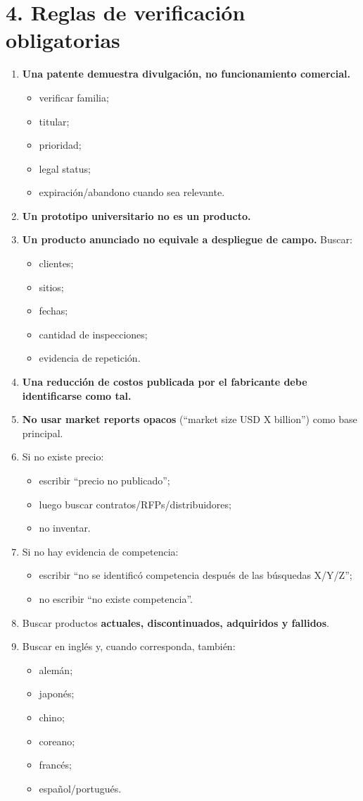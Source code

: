 \documentclass[11pt,a4paper]{article}
\begin{document}
\section*{4. Reglas de verificación obligatorias}
\begin{enumerate}
\item \textbf{Una patente demuestra divulgación, no funcionamiento comercial.}
\begin{itemize}
\item verificar familia;
\item titular;
\item prioridad;
\item legal status;
\item expiración/abandono cuando sea relevante.
\end{itemize}
\item \textbf{Un prototipo universitario no es un producto.}
\item \textbf{Un producto anunciado no equivale a despliegue de campo.}
Buscar:
\begin{itemize}
\item clientes;
\item sitios;
\item fechas;
\item cantidad de inspecciones;
\item evidencia de repetición.
\end{itemize}
\item \textbf{Una reducción de costos publicada por el fabricante debe identificarse como tal.}
\item \textbf{No usar market reports opacos} (``market size USD X billion'') como base principal.
\item Si no existe precio:
\begin{itemize}
\item escribir ``precio no publicado'';
\item luego buscar contratos/RFPs/distribuidores;
\item no inventar.
\end{itemize}
\item Si no hay evidencia de competencia:
\begin{itemize}
\item escribir ``no se identificó competencia después de las búsquedas X/Y/Z'';
\item no escribir ``no existe competencia''.
\end{itemize}
\item Buscar productos \textbf{actuales, discontinuados, adquiridos y fallidos}.
\item Buscar en inglés y, cuando corresponda, también:
\begin{itemize}
\item alemán;
\item japonés;
\item chino;
\item coreano;
\item francés;
\item español/portugués.
\end{itemize}


\end{enumerate}
\end{document}

